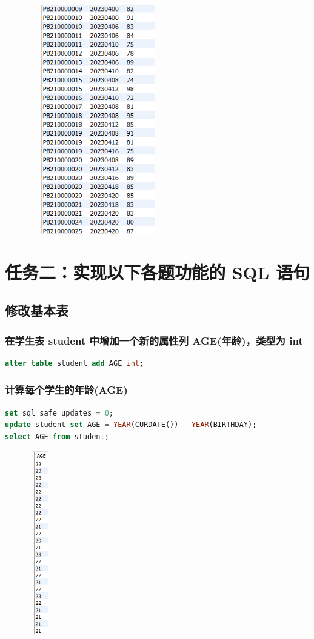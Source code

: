 \documentclass{ctexart}
\begin{document}
					\begin{figure}[H]
						\centering 
						\includegraphics[height=10cm,width=6cm]{6.png}
						\end{figure}
\section{任务二：实现以下各题功能的 SQL 语句}

\subsection{修改基本表}
\subsubsection{在学生表 student 中增加一个新的属性列 AGE(年龄)，类型为 int}
\begin{lstlisting}[language=sql]
	alter table student add AGE int;  
\end{lstlisting}
\subsubsection{计算每个学生的年龄(AGE)}
\begin{lstlisting}[language=sql]
set sql_safe_updates = 0;  
update student set AGE = YEAR(CURDATE()) - YEAR(BIRTHDAY);  
select AGE from student;  
\end{lstlisting}
\begin{figure}[H]
	\centering 
	\includegraphics[height=8cm,width=1cm]{7.png}
	\end{figure}
\end{document}
